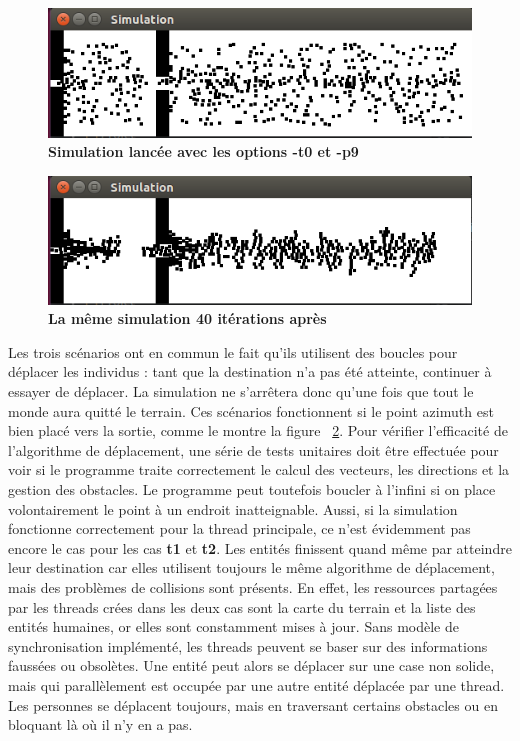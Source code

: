 \documentclass[11pt]{article} %
\begin{document}
\begin{figure}[h]
\caption{\label{f1} \textbf{Simulation lancée avec les options -t0 et -p9}}
  \centering
\includegraphics[width=12cm]{graph}
\end{figure}

\begin{figure}[h]
\caption{\label{f2} \textbf{La même simulation 40 itérations après}}
  \centering
\includegraphics[width=12cm]{graph2}
\end{figure}

Les trois scénarios ont en commun le fait qu'ils utilisent des boucles pour déplacer les individus : tant que la destination n'a pas été atteinte, continuer à essayer de déplacer. La simulation ne s'arrêtera donc qu'une fois que tout le monde aura quitté le terrain. Ces scénarios fonctionnent si le point azimuth est bien placé vers la sortie, comme le montre la figure ~\ref{f2}. 
Pour vérifier l'efficacité de l'algorithme de déplacement, une série de tests unitaires doit être effectuée pour voir si le programme traite correctement le calcul des vecteurs, les directions et la gestion des obstacles. 
Le programme peut toutefois boucler à l'infini si on place volontairement le point à un endroit inatteignable.
Aussi, si la simulation fonctionne correctement pour la thread principale, ce n'est évidemment pas encore le cas pour les cas \textbf{t1} et \textbf{t2}. Les entités finissent quand même par atteindre leur destination car elles utilisent toujours le même algorithme de déplacement, mais des problèmes de collisions sont présents. 
En effet, les ressources partagées par les threads crées dans les deux cas sont la carte du terrain et la liste des entités humaines, or elles sont constamment mises à jour. Sans modèle de synchronisation implémenté, les threads peuvent se baser sur des informations faussées ou obsolètes. Une entité peut alors se déplacer sur une case non solide, mais qui parallèlement est occupée par une autre entité déplacée par une thread. Les personnes se déplacent toujours, mais en traversant certains obstacles ou en bloquant là où il n'y en a pas.
\end{document}
